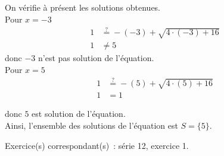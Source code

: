 \documentclass[a4paper,12pt]{report}
\begin{document}
On vérifie à présent les solutions obtenues.
      \\
      Pour $x=-3$
      \begin{align*}
      1 &\stackrel{?}{=} -\left(-3\right)+\sqrt{4\cdot \left(-3\right) + 16 } \\
      1  &\neq 5
      \end{align*}
      donc $-3$ n'est pas solution de l'équation.\\
      Pour $x=5$
      \begin{align*}
      1 &\stackrel{?}{=} -\left(5\right)+\sqrt{4\cdot \left(5\right) + 16 } \\
      1 &= 1      
\end{align*}

      donc $5$ est solution de l'équation.\\
      Ainsi, l'ensemble des solutions de l'équation est $S=\{5\}$.

      \newpage

      \begin{boiteExT}[$x=6+\sqrt{-7x+30}$]
\vspace{20cm}
\end{boiteExT}

Exercice(s) correspondant(s)~: série 12, exercice 1. 
\end{document}
